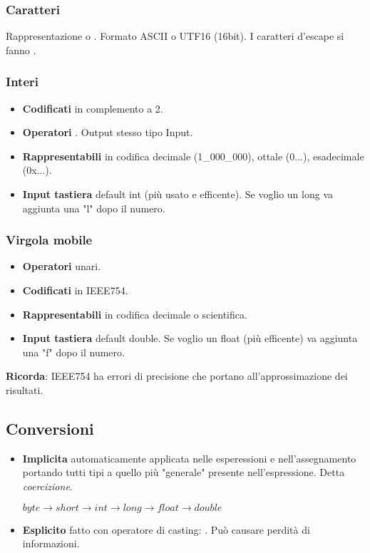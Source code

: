 \subsubsection{Caratteri}
Rappresentazione  o . Formato ASCII o UTF16 (16bit). I caratteri d'escape si fanno .

\subsubsection{Interi}
\begin{itemize}
	\item \textbf{Codificati} in complemento a 2.
	\item \textbf{Operatori} . Output stesso tipo Input.
	\item \textbf{Rappresentabili} in codifica decimale (1\_000\_000), ottale (0...), esadecimale (0x...).
	\item \textbf{Input tastiera} default int (più usato e efficente). Se voglio un long va aggiunta una "l" dopo il numero.
\end{itemize}

\subsubsection{Virgola mobile}
\begin{itemize}
	\item \textbf{Operatori}  unari.
	\item \textbf{Codificati} in IEEE754.
	\item \textbf{Rappresentabili} in codifica decimale o scientifica.
	\item \textbf{Input tastiera} default double. Se voglio un float (più efficente) va aggiunta una "f" dopo il numero.
\end{itemize}
\textbf{Ricorda}: IEEE754 ha errori di precisione che portano all'approssimazione dei risultati.

\subsection{Conversioni}
\begin{itemize}
	\item \textbf{Implicita} automaticamente applicata nelle esperessioni e nell'assegnamento portando tutti tipi a quello più "generale" presente nell'espressione. Detta \textit{coercizione}.

	$byte\to short \to int \to long \to float \to double$
	\item \textbf{Esplicito} fatto con operatore di casting: . Può causare perdità di informazioni.
\end{itemize}

